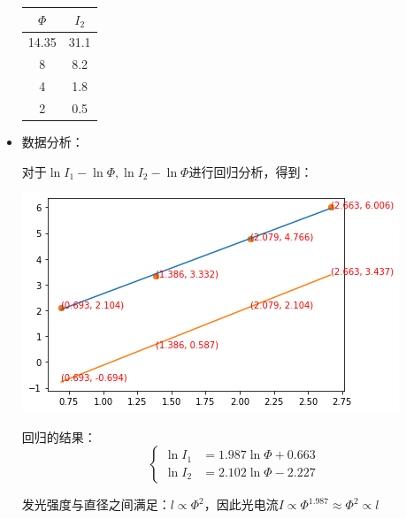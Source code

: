 \documentclass[a4paper]{ltxdoc}
\newenvironment{Figure}
  {\par\medskip\noindent\minipage{\linewidth}}
  {\endminipage\par\medskip}
\begin{document}
\begin{multicols}{2}
\begin{itemize}
\begin{Figure}
                  \smallskip
                  \begin{tabular}{|c|c|}
                      \hline $\Phi$ & $I_2$ \\
                      \hline 14.35  & 31.1  \\
                      \hline 8      & 8.2   \\
                      \hline 4      & 1.8   \\
                      \hline 2      & 0.5   \\
                      \hline
                  \end{tabular}
              \end{Figure}
        \item 数据分析：


              对于$\ln I_1 - \ln \Phi,\ln I_2 - \ln \Phi$进行回归分析，得到：
              \begin{Figure}
                  \centering
                  \includegraphics[width=\linewidth]{img/3.png}
              \end{Figure}
              回归的结果：
              $$
                  \left\{
                  \begin{aligned}
                      \ln I_1 & = 1.987 \ln \Phi +0.663 \\
                      \ln I_2 & = 2.102 \ln \Phi -2.227
                  \end{aligned}
                  \right.
              $$

              发光强度与直径之间满足：$l \propto \Phi ^2$，因此光电流$I \propto \Phi ^{1.987} \approx \Phi ^2 \propto l$
    \end{itemize}

\end{multicols}
\end{document}
